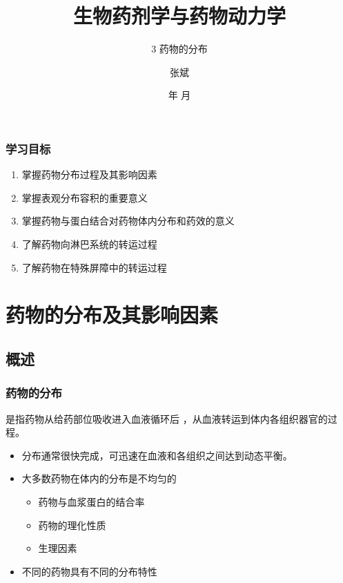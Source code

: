 \documentclass[dvipsnames, svgnames, x11names]{beamer}
\title{生物药剂学与药物动力学}
\subtitle{3 药物的分布}
\author{张斌}
\institute[理工系]{河北农业大学 理工系}
\date{\the\year 年 \the\month 月}
\begin{document}
	
\maketitle


\begin{frame}
    \frametitle{学习目标}
    \begin{enumerate}
      \item 掌握药物分布过程及其影响因素
      \item 掌握表观分布容积的重要意义
      \item 掌握药物与蛋白结合对药物体内分布和药效的意义
      \item 了解药物向淋巴系统的转运过程
      \item 了解药物在特殊屏障中的转运过程
    \end{enumerate}
\end{frame}


\begin{frame}{}
	\begin{center}
		{\Huge {}}
	\end{center}
	\tableofcontents[subsectionstyle=hide/hide/show]
	\thispagestyle{empty}
	\addtocounter{framenumber}{-1}
\end{frame}

\section{药物的分布及其影响因素}


\subsection{概述}


\begin{frame}
	\frametitle{药物的分布}
	是指药物从给药部位吸收进入血液循环后 ，从血液转运到体内各组织器官的过程。 
    
    \begin{itemize}
      \item 分布通常很快完成，可迅速在血液和各组织之间达到动态平衡。
      \item 大多数药物在体内的分布是不均匀的
        \begin{itemize}
          \item 药物与血浆蛋白的结合率
          \item 药物的理化性质
          \item 生理因素
        \end{itemize}
      \item 不同的药物具有不同的分布特性
    \end{itemize}
\end{frame}
\end{document}
